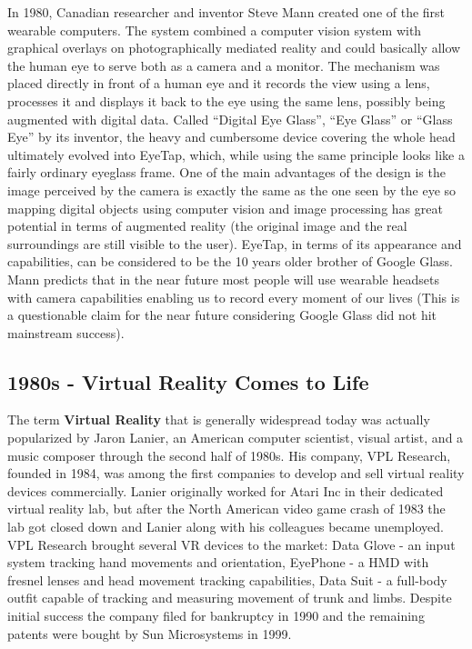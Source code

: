 \documentclass[12pt, a4paper]{article}
\begin{document}
In 1980, Canadian researcher and inventor Steve Mann created one of the first wearable computers. The system combined a computer vision system with graphical overlays on photographically mediated reality and could basically allow the human eye to serve both as a camera and a monitor. The mechanism was placed directly in front of a human eye and it records the view using a lens, processes it and displays it back to the eye using the same lens, possibly being augmented with digital data. Called “Digital Eye Glass”, “Eye Glass” or “Glass Eye” by its inventor, the heavy and cumbersome device covering the whole head ultimately evolved into EyeTap, which, while using the same principle looks like a fairly ordinary eyeglass frame. One of the main advantages of the design is the image perceived by the camera is exactly the same as the one seen by the eye so mapping digital objects using computer vision and image processing has great potential in terms of augmented reality (the original image and the real surroundings are still visible to the user). EyeTap, in terms of its appearance and capabilities, can be considered to be the 10 years older brother of Google Glass. Mann predicts that in the near future most people will use wearable headsets with camera capabilities enabling us to record every moment of our lives (This is a questionable claim for the near future considering Google Glass did not hit mainstream success).


\subsection{1980s - Virtual Reality Comes to Life}
The term \textbf{Virtual Reality} that is generally widespread today was actually popularized by Jaron Lanier, an American computer scientist, visual artist, and a music composer through the second half of 1980s. His company, VPL Research, founded in 1984, was among the first companies to develop and sell virtual reality devices commercially. Lanier originally worked for Atari Inc in their dedicated virtual reality lab, but after the North American video game crash of 1983 the lab got closed down and Lanier along with his colleagues became unemployed. VPL Research brought several VR devices to the market: Data Glove - an input system tracking hand movements and orientation, EyePhone - a HMD with fresnel lenses and head movement tracking capabilities, Data Suit - a full-body outfit capable of tracking and measuring movement of trunk and limbs. Despite initial success the company filed for bankruptcy in 1990 and the remaining patents were bought by Sun Microsystems in 1999.
\end{document}
